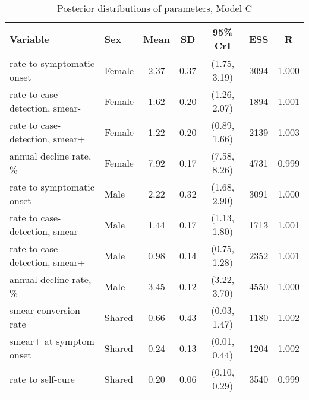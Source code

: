 \begin{table}[h]

\caption{\label{tab:}Posterior distributions of parameters, Model C}
\centering
\begin{tabular}[t]{llccccc}
\toprule
Variable & Sex & Mean & SD & 95\% CrI & ESS & \^{R}\\
\midrule
rate to symptomatic onset & Female & 2.37 & 0.37 & (1.75, 3.19) & 3094 & 1.000\\
rate to case-detection, smear- & Female & 1.62 & 0.20 & (1.26, 2.07) & 1894 & 1.001\\
rate to case-detection, smear+ & Female & 1.22 & 0.20 & (0.89, 1.66) & 2139 & 1.003\\
annual decline rate, \% & Female & 7.92 & 0.17 & (7.58, 8.26) & 4731 & 0.999\\
\addlinespace
rate to symptomatic onset & Male & 2.22 & 0.32 & (1.68, 2.90) & 3091 & 1.000\\
rate to case-detection, smear- & Male & 1.44 & 0.17 & (1.13, 1.80) & 1713 & 1.001\\
rate to case-detection, smear+ & Male & 0.98 & 0.14 & (0.75, 1.28) & 2352 & 1.001\\
annual decline rate, \% & Male & 3.45 & 0.12 & (3.22, 3.70) & 4550 & 1.000\\
\addlinespace
smear conversion rate & Shared & 0.66 & 0.43 & (0.03, 1.47) & 1180 & 1.002\\
smear+ at symptom onset & Shared & 0.24 & 0.13 & (0.01, 0.44) & 1204 & 1.002\\
rate to self-cure & Shared & 0.20 & 0.06 & (0.10, 0.29) & 3540 & 0.999\\
\bottomrule
\end{tabular}
\end{table}

